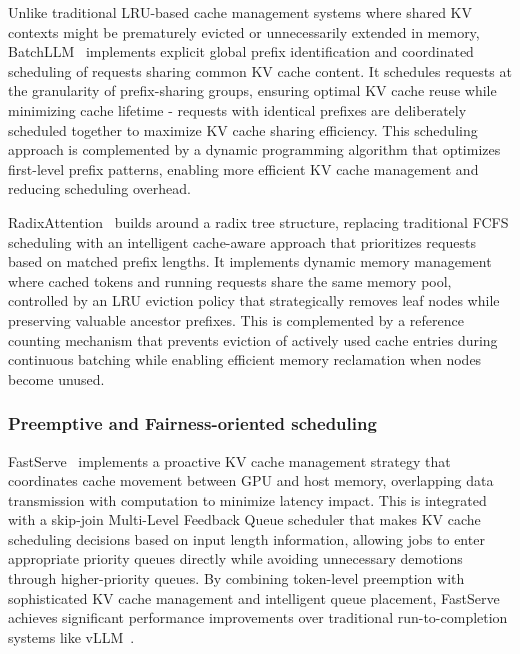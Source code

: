 Unlike traditional LRU-based cache management systems where shared KV contexts might be prematurely evicted or unnecessarily extended in memory, BatchLLM~\cite{zheng2024batchllmoptimizinglargebatched} implements explicit global prefix identification and coordinated scheduling of requests sharing common KV cache content. It schedules requests at the granularity of prefix-sharing groups, ensuring optimal KV cache reuse while minimizing cache lifetime - requests with identical prefixes are deliberately scheduled together to maximize KV cache sharing efficiency. This scheduling approach is complemented by a dynamic programming algorithm that optimizes first-level prefix patterns, enabling more efficient KV cache management and reducing scheduling overhead. 

RadixAttention~\cite{zheng2024sglangefficientexecutionstructured} builds around a radix tree structure, replacing traditional FCFS scheduling with an intelligent cache-aware approach that prioritizes requests based on matched prefix lengths. It implements dynamic memory management where cached tokens and running requests share the same memory pool, controlled by an LRU eviction policy that strategically removes leaf nodes while preserving valuable ancestor prefixes. This is complemented by a reference counting mechanism that prevents eviction of actively used cache entries during continuous batching while enabling efficient memory reclamation when nodes become unused. 


\subsubsection{Preemptive and Fairness-oriented scheduling}\label{sec:sys_sch_pfs} FastServe~\cite{wu2024fastdistributedinferenceserving} implements a proactive KV cache management strategy that coordinates cache movement between GPU and host memory, overlapping data transmission with computation to minimize latency impact. This is integrated with a skip-join Multi-Level Feedback Queue scheduler that makes KV cache scheduling decisions based on input length information, allowing jobs to enter appropriate priority queues directly while avoiding unnecessary demotions through higher-priority queues. By combining token-level preemption with sophisticated KV cache management and intelligent queue placement, FastServe~\cite{wu2024fastdistributedinferenceserving} achieves significant performance improvements over traditional run-to-completion systems like vLLM~\cite{DBLP:conf/sosp/KwonLZ0ZY0ZS23}.


